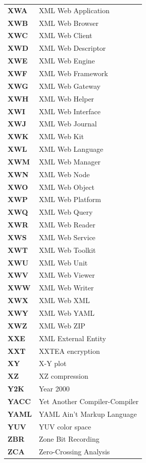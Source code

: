 \begin{longtable}{p{3cm}p{11cm}}
\textbf{XWA} & XML Web Application \\
\textbf{XWB} & XML Web Browser \\
\textbf{XWC} & XML Web Client \\
\textbf{XWD} & XML Web Descriptor \\
\textbf{XWE} & XML Web Engine \\
\textbf{XWF} & XML Web Framework \\
\textbf{XWG} & XML Web Gateway \\
\textbf{XWH} & XML Web Helper \\
\textbf{XWI} & XML Web Interface \\
\textbf{XWJ} & XML Web Journal \\
\textbf{XWK} & XML Web Kit \\
\textbf{XWL} & XML Web Language \\
\textbf{XWM} & XML Web Manager \\
\textbf{XWN} & XML Web Node \\
\textbf{XWO} & XML Web Object \\
\textbf{XWP} & XML Web Platform \\
\textbf{XWQ} & XML Web Query \\
\textbf{XWR} & XML Web Reader \\
\textbf{XWS} & XML Web Service \\
\textbf{XWT} & XML Web Toolkit \\
\textbf{XWU} & XML Web Unit \\
\textbf{XWV} & XML Web Viewer \\
\textbf{XWW} & XML Web Writer \\
\textbf{XWX} & XML Web XML \\
\textbf{XWY} & XML Web YAML \\
\textbf{XWZ} & XML Web ZIP \\
\textbf{XXE} & XML External Entity \\
\textbf{XXT} & XXTEA encryption \\
\textbf{XY} & X-Y plot \\
\textbf{XZ} & XZ compression \\
\textbf{Y2K} & Year 2000 \\
\textbf{YACC} & Yet Another Compiler-Compiler \\
\textbf{YAML} & YAML Ain't Markup Language \\
\textbf{YUV} & YUV color space \\
\textbf{ZBR} & Zone Bit Recording \\
\textbf{ZCA} & Zero-Crossing Analysis \\

\end{longtable}
